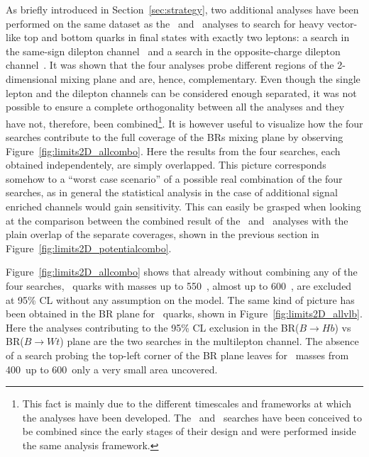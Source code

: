As briefly introduced in Section~\ref{sec:strategy}, two
additional analyses have been performed on the same dataset
as the \wbx\ and \htx\ analyses to search for heavy vector-like
top and bottom quarks in final states with exactly two leptons:
a search in the same-sign 
dilepton channel~\cite{ATLAS-CONF-2013-051} and 
a search in the opposite-charge dilepton channel~\cite{ATLAS-CONF-2013-056}.
It was shown that the four analyses probe different 
regions of the 2-dimensional mixing plane and are,
hence, complementary. Even though the single lepton and
the dilepton channels can be considered enough
separated, it was not possible to ensure a complete
orthogonality between all the analyses and they have
not, therefore, been combined\footnote{This
fact is mainly due to the different timescales
and frameworks at which the analyses have been developed. 
The \wbx\ and \htx\ searches
have been conceived to be combined since the
early stages of their design and were performed
inside the same analysis framework.}.
It is however useful to visualize how
the four searches contribute to the full
coverage of the BRs mixing plane by
observing Figure~\ref{fig:limits2D_allcombo}.
Here the results from the four searches,
each obtained independentely, are simply
overlapped. This picture corresponds somehow to
a ``worst case scenario'' of a possible
real combination of the four searches, as
in general the statistical analysis in the
case of additional signal enriched
channels would gain sensitivity. 
This can easily be grasped when looking
at the comparison between the combined result
of the \wbx\ and \htx\ analyses
with the plain overlap of the separate
coverages, shown in the previous section 
in Figure~\ref{fig:limits2D_potentialcombo}.

Figure~\ref{fig:limits2D_allcombo} shows that already
without combining any of the four searches,
\T\ quarks with masses up to 550~\gev, almost up
to 600~\gev, are excluded at 95\% CL without 
any assumption on the model. The same kind of
picture has been obtained in the BR plane for
\B\ quarks, shown in Figure~\ref{fig:limits2D_allvlb}.
Here the analyses contributing to the
95\% CL exclusion in the BR($B\to Hb$) vs  BR($B\to Wt$)
plane are the two searches in the multilepton channel.
The absence of a search probing the top-left corner
of the BR plane leaves for \B\ masses from 400~\gev up to
600~\gev only a very small area uncovered.


